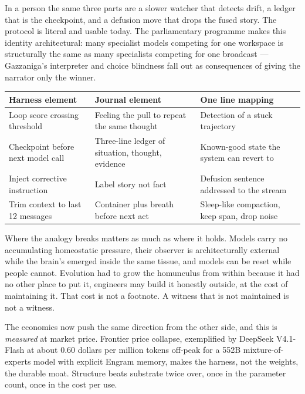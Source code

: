 In a person the same three parts are a slower watcher that detects drift, a ledger that is the checkpoint, and a defusion move that drops the fused story. The protocol is literal and usable today. The parliamentary programme makes this identity architectural: many specialist models competing for one workspace is structurally the same as many specialists competing for one broadcast --- Gazzaniga's interpreter and choice blindness fall out as consequences of giving the narrator only the winner.

\begin{center}
\small
\begin{tabular}{p{2.8cm}p{4.2cm}p{5.6cm}}
\toprule
Harness element & Journal element & One line mapping \\
\midrule
Loop score crossing threshold & Feeling the pull to repeat the same thought & Detection of a stuck trajectory \\
Checkpoint before next model call & Three-line ledger of situation, thought, evidence & Known-good state the system can revert to \\
Inject corrective instruction & Label story not fact & Defusion sentence addressed to the stream \\
Trim context to last 12 messages & Container plus breath before next act & Sleep-like compaction, keep span, drop noise \\
\bottomrule
\end{tabular}
\end{center}

Where the analogy breaks matters as much as where it holds. Models carry no accumulating homeostatic pressure, their observer is architecturally external while the brain's emerged inside the same tissue, and models can be reset while people cannot. Evolution had to grow the homunculus from within because it had no other place to put it, engineers may build it honestly outside, at the cost of maintaining it. That cost is not a footnote. A witness that is not maintained is not a witness.

The economics now push the same direction from the other side, and this is \textit{measured} at market price. Frontier price collapse, exemplified by DeepSeek V4.1-Flash at about 0.60 dollars per million tokens off-peak for a 552B mixture-of-experts model with explicit Engram memory, makes the harness, not the weights, the durable moat. Structure beats substrate twice over, once in the parameter count, once in the cost per use.


